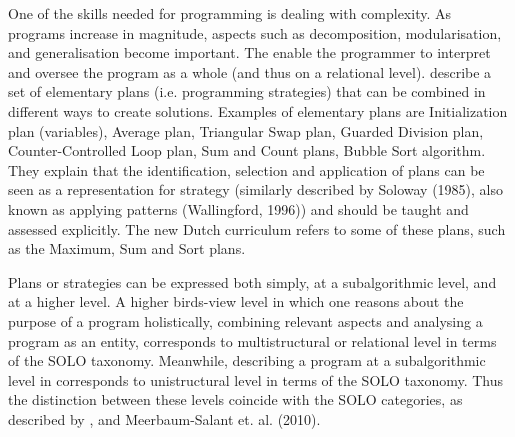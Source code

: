 One of the skills needed for programming is dealing with complexity. As programs increase in magnitude, aspects such as decomposition, modularisation, and generalisation become important. The enable the programmer to interpret and oversee the program as a whole (and thus on a relational level).  describe a set of elementary plans (i.e. programming strategies) that can be combined in different ways to create solutions. Examples of elementary plans are Initialization plan (variables), Average plan, Triangular Swap plan, Guarded Division plan, Counter-Controlled Loop plan, Sum and Count plans, Bubble Sort algorithm. They explain that the identification, selection and application of plans can be seen as a representation for strategy (similarly described by Soloway (1985), also known as applying patterns (Wallingford, 1996)) and should be taught and assessed explicitly. The new Dutch curriculum \cite{Barendsen2016} refers to some of these plans, such as the Maximum, Sum and Sort plans.

Plans or strategies can be expressed both simply, at a subalgorithmic level, and at a higher level\cite{deRaadt2006}. A higher birds-view level in which one reasons about the purpose of a program holistically, combining relevant aspects and analysing a program as an entity, corresponds to multistructural or relational level in terms of the SOLO taxonomy\cite{Smetsers2017}. Meanwhile, describing a program at a subalgorithmic level in corresponds to unistructural level in terms of the SOLO taxonomy. Thus the distinction between these levels coincide with the SOLO categories, as described by ,  and Meerbaum-Salant et. al. (2010).

